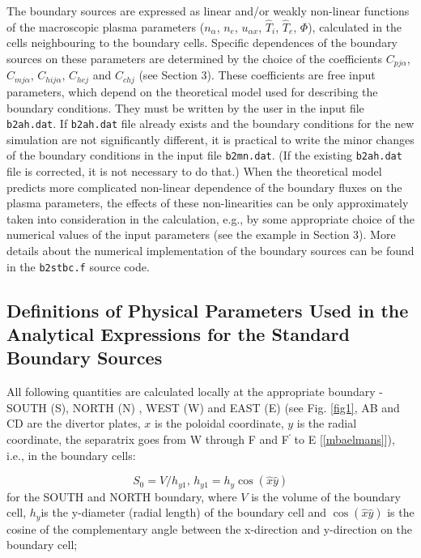 \documentclass[11pt]{article}
\begin{document}
\bigskip

The boundary sources are expressed as linear and/or weakly non-linear
functions of the macroscopic plasma parameters ($n_{\alpha}$, $n_{e}$, $%
u_{\alpha x}$, $\widehat{T}_{i}$, $\widehat{T}_{e}$, $\Phi$), calculated in
the cells neighbouring to the boundary cells. Specific dependences of the
boundary sources on these parameters are determined by the choice of the
coefficients $C_{pj\alpha}$, $C_{mj\alpha}$, $C_{hij\alpha}$, $C_{hej}$ and $%
C_{chj}$ (see Section 3). These coefficients are free input parameters,
which depend on the theoretical model used for describing the boundary
conditions. They must be written by the user in the input file \texttt{%
b2ah.dat}. If \texttt{b2ah.dat} file already exists and the boundary
conditions for the new simulation are not significantly different, it is
practical to write the minor changes of the boundary conditions in the input
file \texttt{b2mn.dat}. (If the existing \texttt{b2ah.dat} file is
corrected, it is not necessary to do that.) When the theoretical model
predicts more complicated non-linear dependence of the boundary fluxes on
the plasma parameters, the effects of these non-linearities can be only
approximately taken into consideration in the calculation, e.g., by some
appropriate choice of the numerical values of the input parameters (see the
example in Section 3). More details about the numerical implementation of
the boundary sources can be found in the \texttt{b2stbc.f} source code.

\bigskip

\subsection{Definitions of Physical Parameters Used in the Analytical
Expressions for the Standard Boundary Sources}

\bigskip

All following quantities are calculated locally at the appropriate boundary
- SOUTH (S), NORTH (N) , WEST (W) and EAST (E) (see Fig. \ref{fig1}, AB and
CD are the divertor plates, $x$ is the poloidal coordinate, $y$ is the
radial coordinate, the separatrix goes from W through F and F$^{%
{\acute{}}%
}$ to E [\ref{mbaelmans}]), i.e., in the boundary cells:

\bigskip

\begin{equation}
S_{0}=V/h_{y1}\text{, \ \ \ }h_{y1}=h_{y}\cos(\widehat{x}\widehat{y}) 
\label{5}
\end{equation}
for the SOUTH and NORTH boundary, where $V$ is the volume of the boundary
cell, $h_{y}$is the y-diameter (radial length) of the boundary cell and $%
\cos(\widehat{x}\widehat{y})$ is the cosine of the complementary angle
between the x-direction and y-direction on the boundary cell;
\end{document}
